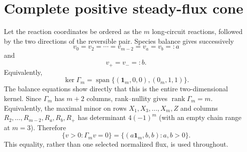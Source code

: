 \section*{Complete positive steady-flux cone}
Let the reaction coordinates be ordered as the $m$ long-circuit reactions,
followed by the two directions of the reversible pair.  Species balance gives
successively
\[
v_0=v_2=\cdots=v_{m-2}=v_a=v_b=:a
\]
and
\[
v_+=v_-=:b.
\]
Equivalently,
\[
\ker\Gamma_m=\operatorname{span}\{(\mathbf1_m,0,0),(0_m,1,1)\}.
\]
The balance equations show directly that this is the entire two-dimensional
kernel.  Since $\Gamma_m$ has $m+2$ columns, rank--nullity gives
$\operatorname{rank}\Gamma_m=m$.  Equivalently, the maximal minor on rows
$X_1,X_3,\ldots,X_m,Z$ and columns
$R_2,\ldots,R_{m-2},R_a,R_b,R_+$ has determinant $4(-1)^m$ (with an empty
chain range at $m=3$).  Therefore
\[
\{v>0:\Gamma_mv=0\}=\{(a\mathbf1_m,b,b):a,b>0\}.
\]
This equality, rather than one selected normalized flux, is used throughout.
